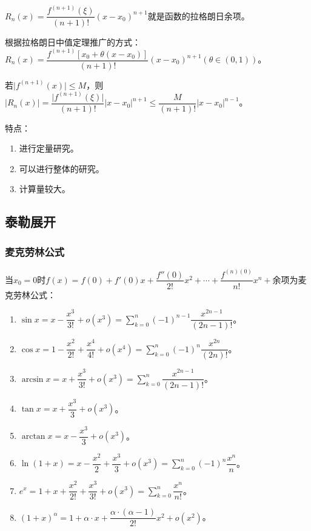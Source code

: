 \documentclass[UTF8, 12pt]{ctexart}
\begin{document}
        $R_n(x)=\dfrac{f^{(n+1)}(\xi)}{(n+1)!}(x-x_0)^{n+1}$就是函数的拉格朗日余项。

        根据拉格朗日中值定理推广的方式：$R_n(x)=\dfrac{f^{(n+1)}[x_0+\theta(x-x_0)]}{(n+1)!}(x-x_0)^{n+1}(\theta\in(0,1))$。

        若$\vert f^{(n+1)}(x)\vert\leqslant M$，则$\vert R_n(x)\vert=\dfrac{\vert f^{(n+1)}(\xi)\vert}{(n+1)!}\vert x-x_0\vert^{n+1}\leqslant\dfrac{M}{(n+1)!}\vert x-x_0\vert^{n-1}$。

        特点：

        \begin{enumerate}
            \item 进行定量研究。
            \item 可以进行整体的研究。
            \item 计算量较大。
        \end{enumerate}

        \subsection{泰勒展开}

        \subsubsection{麦克劳林公式}

        当$x_0=0$时$f(x)=f(0)+f'(0)x+\dfrac{f''(0)}{2!}x^2+\cdots+\dfrac{f^{(n)(0)}}{n!}x^n+\text{余项}$为麦克劳林公式：

        \begin{enumerate}
            \item $\sin x=x-\dfrac{x^3}{3!}+o(x^3)=\sum\limits_{k=0}^n(-1)^{n-1}\dfrac{x^{2n-1}}{(2n-1)!}$。
            \item $\cos x=1-\dfrac{x^2}{2!}+\dfrac{x^4}{4!}+o(x^4)=\sum\limits_{k=0}^n(-1)^n\dfrac{x^{2n}}{(2n)!}$。
            \item $\arcsin x=x+\dfrac{x^3}{3!}+o(x^3)=\sum\limits_{k=0}^n\dfrac{x^{2n-1}}{(2n-1)!}$。
            \item $\tan x=x+\dfrac{x^3}{3}+o(x^3)$。
            \item $\arctan x=x-\dfrac{x^3}{3}+o(x^3)$。
            \item $\ln(1+x)=x-\dfrac{x^2}{2}+\dfrac{x^3}{3}+o(x^3)=\sum\limits_{k=0}^n(-1)^n\dfrac{x^n}{n}$。
            \item $e^x=1+x+\dfrac{x^2}{2!}+\dfrac{x^3}{3!}+o(x^3)=\sum\limits_{k=0}^n\dfrac{x^n}{n!}$。
            \item $(1+x)^\alpha=1+\alpha\cdot x+\dfrac{\alpha\cdot(\alpha-1)}{2!}x^2+o(x^2)$。
        \end{enumerate}
\end{document}
